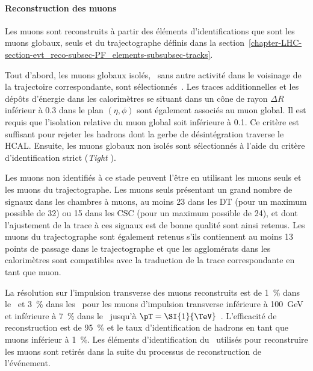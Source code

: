 \paragraph{Reconstruction des muons}
Les muons sont reconstruits à partir des éléments d'identifications que sont les muons globaux, seuls et du trajectographe définis dans la section~\ref{chapter-LHC-section-evt_reco-subsec-PF_elements-subsubsec-tracks}.
\par Tout d'abord, les muons globaux isolés, \ie\ sans autre activité dans le voisinage de la trajectoire correspondante, sont sélectionnés~\cite{particle-flow}.
Les traces additionnelles et les dépôts d'énergie dans les calorimètres se situant dans un cône de rayon $\Delta R$ inférieur à \num{0.3} dans le plan $(\eta,\phi)$ sont également associés au muon global.
Il est requis que l'isolation relative du muon global soit inférieure à \num{0.1}.
Ce critère est suffisant pour rejeter les hadrons dont la gerbe de désintégration traverse le HCAL.
Ensuite, les muons globaux non isolés sont sélectionnés à l'aide du critère d'identification strict (\emph{Tight} \muonID).
\par Les muons non identifiés à ce stade peuvent l'être en utilisant les muons seuls et les muons du trajectographe.
Les muons seuls présentant un grand nombre de signaux dans les chambres à muons, au moins 23 dans les DT (pour un maximum possible de 32) ou 15 dans les CSC (pour un maximum possible de 24), et dont l'ajustement de la trace à ces signaux est de bonne qualité sont ainsi retenus.
Les muons du trajectographe sont également retenus s'ils contiennent au moins 13 points de passage dans le trajectographe et que les agglomérats dans les calorimètres sont compatibles avec la traduction de la trace correspondante en tant que muon.
\par La résolution sur l'impulsion transverse des muons reconstruits est de \SI{1}{\%} dans le \CMSbarrel\ et \SI{3}{\%} dans les \CMSendcaps\ pour les muons d'impulsion transverse inférieure à \SI{100}{\GeV}
et inférieure à \SI{7}{\%} dans le \CMSbarrel\ jusqu'à $\pT=\SI{1}{\TeV}$~\cite{CMS-MUO-16-001}.
L'efficacité de reconstruction est de \SI{95}{\%} et le taux d'identification de hadrons en tant que muons inférieur à \SI{1}{\%}.
Les éléments d'identification du \PF\ utilisés pour reconstruire les muons sont retirés dans la suite du processus de reconstruction de l'événement.
